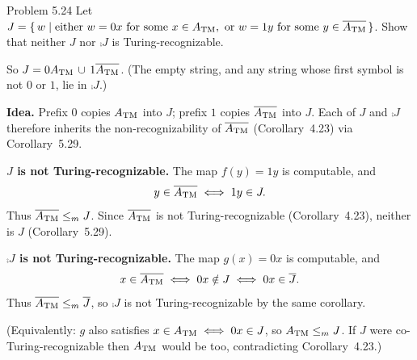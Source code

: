 \begin{question}{Problem 5.24}
Let $J=\{\,w\mid\text{either }w=0x\text{ for some }x\in A_{\mathrm{TM}},\text{ or }w=1y\text{ for some }y\in\overline{A_{\mathrm{TM}}}\,\}$.
Show that neither $J$ nor $\comp{J}$ is Turing-recognizable.
\end{question}
\begin{soln}
So $J=0A_{\mathrm{TM}}\,\cup\,1\overline{A_{\mathrm{TM}}}$.
(The empty string, and any string whose first symbol is not $0$ or $1$, lie in $\comp{J}$.)

\textbf{Idea.} Prefix $0$ copies $A_{\mathrm{TM}}$ into $J$; prefix $1$ copies $\overline{A_{\mathrm{TM}}}$ into $J$. Each of $J$ and $\comp{J}$ therefore inherits the non-recognizability of $\overline{A_{\mathrm{TM}}}$ (Corollary~4.23) via Corollary~5.29.

\textbf{$J$ is not Turing-recognizable.}
The map $f(y)=1y$ is computable, and
\[
y\in\overline{A_{\mathrm{TM}}}\iff 1y\in J.
\]
Thus $\overline{A_{\mathrm{TM}}}\le_{m} J$. Since $\overline{A_{\mathrm{TM}}}$ is not Turing-recognizable (Corollary~4.23), neither is $J$ (Corollary~5.29).

\textbf{$\comp{J}$ is not Turing-recognizable.}
The map $g(x)=0x$ is computable, and
\[
x\in\overline{A_{\mathrm{TM}}}\iff 0x\notin J\iff 0x\in\overline{J}.
\]
Thus $\overline{A_{\mathrm{TM}}}\le_{m}\overline{J}$, so $\comp{J}$ is not Turing-recognizable by the same corollary.

(Equivalently: $g$ also satisfies $x\in A_{\mathrm{TM}}\iff 0x\in J$, so $A_{\mathrm{TM}}\le_{m} J$. If $J$ were co-Turing-recognizable then $A_{\mathrm{TM}}$ would be too, contradicting Corollary~4.23.)
\end{soln}
